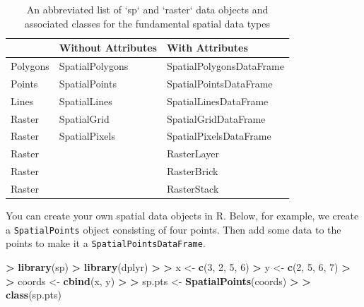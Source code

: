 \documentclass[]{krantz}
\makeatletter
\newenvironment{Shaded}{\begin{snugshade}}{\end{snugshade}}
\newcommand{\KeywordTok}[1]{\textcolor[rgb]{0.27,0.27,0.27}{\textbf{#1}}}
\newcommand{\DecValTok}[1]{\textcolor[rgb]{0.06,0.06,0.06}{#1}}
\newcommand{\StringTok}[1]{\textcolor[rgb]{0.5,0.5,0.5}{#1}}
\newcommand{\OperatorTok}[1]{\textcolor[rgb]{0.43,0.43,0.43}{\textbf{#1}}}
\newcommand{\ErrorTok}[1]{\textcolor[rgb]{0.14,0.14,0.14}{\textbf{#1}}}
\newcommand{\NormalTok}[1]{#1}
\newenvironment{kframe}{%
\medskip{}
\setlength{\fboxsep}{.8em}
 \def\at@end@of@kframe{}%
 \ifinner\ifhmode%
  \def\at@end@of@kframe{\end{minipage}}%
  \begin{minipage}{\columnwidth}%
 \fi\fi%
 \def\FrameCommand##1{\hskip\@totalleftmargin \hskip-\fboxsep
 \colorbox{shadecolor}{##1}\hskip-\fboxsep
     \hskip-\linewidth \hskip-\@totalleftmargin \hskip\columnwidth}%
 \MakeFramed {\advance\hsize-\width
   \@totalleftmargin\z@ \linewidth\hsize
   \@setminipage}}%
 {\par\unskip\endMakeFramed%
 \at@end@of@kframe}
\renewenvironment{Shaded}{\begin{kframe}}{\end{kframe}}
\theoremstyle{definition}
\theoremstyle{definition}
\theoremstyle{definition}
\theoremstyle{remark}
\makeatother
\begin{document}
\begin{table}

\caption{\label{tab:spatialObjs}An abbreviated list of `sp` and `raster` data objects and associated classes for the fundamental spatial data types}
\centering
\begin{tabular}[t]{lll}
\toprule
 & Without Attributes & With Attributes\\
\midrule
Polygons & SpatialPolygons & SpatialPolygonsDataFrame\\
Points & SpatialPoints & SpatialPointsDataFrame\\
Lines & SpatialLines & SpatialLinesDataFrame\\
Raster & SpatialGrid & SpatialGridDataFrame\\
Raster & SpatialPixels & SpatialPixelsDataFrame\\
\addlinespace
Raster &  & RasterLayer\\
Raster &  & RasterBrick\\
Raster &  & RasterStack\\
\bottomrule
\end{tabular}
\end{table}

You can create your own spatial data objects in R. Below, for example,
we create a \texttt{SpatialPoints} object consisting of four points.
Then add some data to the points to make it a
\texttt{SpatialPointsDataFrame}.

\begin{Shaded}
\begin{Highlighting}[]
\OperatorTok{>}\StringTok{ }\KeywordTok{library}\NormalTok{(sp)}
\OperatorTok{>}\StringTok{ }\KeywordTok{library}\NormalTok{(dplyr)}
\OperatorTok{>}\StringTok{ }
\ErrorTok{>}\StringTok{ }\NormalTok{x <-}\StringTok{ }\KeywordTok{c}\NormalTok{(}\DecValTok{3}\NormalTok{, }\DecValTok{2}\NormalTok{, }\DecValTok{5}\NormalTok{, }\DecValTok{6}\NormalTok{)}
\OperatorTok{>}\StringTok{ }\NormalTok{y <-}\StringTok{ }\KeywordTok{c}\NormalTok{(}\DecValTok{2}\NormalTok{, }\DecValTok{5}\NormalTok{, }\DecValTok{6}\NormalTok{, }\DecValTok{7}\NormalTok{)}
\OperatorTok{>}\StringTok{ }
\ErrorTok{>}\StringTok{ }\NormalTok{coords <-}\StringTok{ }\KeywordTok{cbind}\NormalTok{(x, y)}
\OperatorTok{>}\StringTok{ }
\ErrorTok{>}\StringTok{ }\NormalTok{sp.pts <-}\StringTok{ }\KeywordTok{SpatialPoints}\NormalTok{(coords)}
\OperatorTok{>}\StringTok{ }
\ErrorTok{>}\StringTok{ }\KeywordTok{class}\NormalTok{(sp.pts)}
\end{Highlighting}
\end{Shaded}
\end{document}
